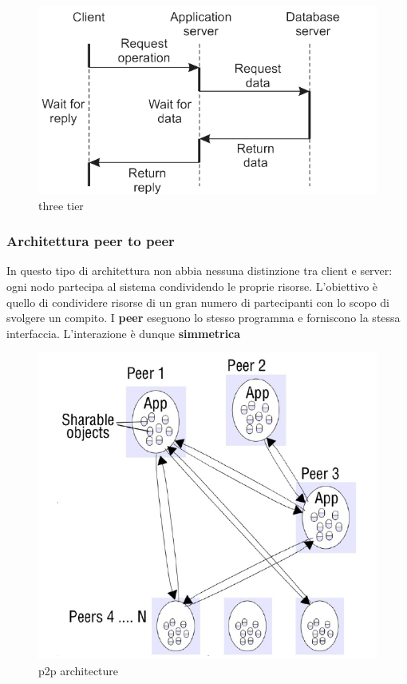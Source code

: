 \documentclass[12pt]{article}
\begin{document}
 		\begin{figure}[h!]
 			\centering
 			\includegraphics[scale=0.40]{img/three.png}
 			\caption{three tier}
 		\end{figure}
 	\subsubsection{Architettura peer to peer}
 		In questo tipo di architettura non abbia nessuna distinzione tra client e server: ogni nodo partecipa al sistema condividendo le proprie risorse. L'obiettivo è quello di condividere risorse di un gran numero di partecipanti con lo scopo di svolgere un compito. I \textbf{peer} eseguono lo stesso programma e forniscono la stessa interfaccia. L'interazione è dunque \textbf{simmetrica}
 		\begin{figure}[h!]
 			\centering
 			\includegraphics[scale=0.40]{img/p2p.png}
 			\caption{p2p architecture}
 		\end{figure}
\end{document}
